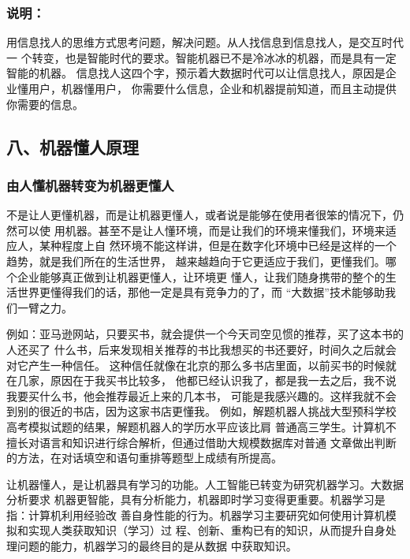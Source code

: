 \documentclass[11pt]{ctexart}
\begin{document}
{{{{\subsubsection{说明：}
\label{sec:org18c6313}

用信息找人的思维方式思考问题，解决问题。从人找信息到信息找人，是交互时代一
个转变，也是智能时代的要求。智能机器已不是冷冰冰的机器，而是具有一定智能的机器。
信息找人这四个字，预示着大数据时代可以让信息找人，原因是企业懂用户，机器懂用户，
你需要什么信息，企业和机器提前知道，而且主动提供你需要的信息。

\subsection{八、机器懂人原理}
\label{sec:orgff53726}

\subsubsection{由人懂机器转变为机器更懂人}
\label{sec:org1d7c53f}

不是让人更懂机器，而是让机器更懂人，或者说是能够在使用者很笨的情况下，仍然可以使
用机器。甚至不是让人懂环境，而是让我们的环境来懂我们，环境来适应人，某种程度上自
然环境不能这样讲，但是在数字化环境中已经是这样的一个趋势，就是我们所在的生活世界，
越来越趋向于它更适应于我们，更懂我们。哪个企业能够真正做到让机器更懂人，让环境更
懂人，让我们随身携带的整个的生活世界更懂得我们的话，那他一定是具有竞争力的了，而
“大数据”技术能够助我们一臂之力。

例如：亚马逊网站，只要买书，就会提供一个今天司空见惯的推荐，买了这本书的人还买了
什么书，后来发现相关推荐的书比我想买的书还要好，时间久之后就会对它产生一种信任。
这种信任就像在北京的那么多书店里面，以前买书的时候就在几家，原因在于我买书比较多，
他都已经认识我了，都是我一去之后，我不说我要买什么书，他会推荐最近上来的几本书，
可能是我感兴趣的。这样我就不会到别的很近的书店，因为这家书店更懂我。
例如，解题机器人挑战大型预科学校高考模拟试题的结果，解题机器人的学历水平应该比肩
普通高三学生。计算机不擅长对语言和知识进行综合解析，但通过借助大规模数据库对普通
文章做出判断的方法，在对话填空和语句重排等题型上成绩有所提高。

让机器懂人，是让机器具有学习的功能。人工智能已转变为研究机器学习。大数据分析要求
机器更智能，具有分析能力，机器即时学习变得更重要。机器学习是指：计算机利用经验改
善自身性能的行为。机器学习主要研究如何使用计算机模拟和实现人类获取知识（学习）过
程、创新、重构已有的知识，从而提升自身处理问题的能力，机器学习的最终目的是从数据
中获取知识。

}}}}
\end{document}

